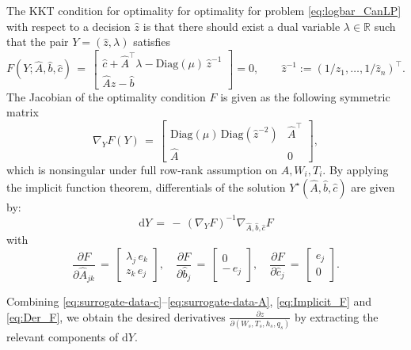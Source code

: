 \documentclass{article}
\begin{document}
The KKT condition for optimality for optimality for problem \ref{eq:logbar_CanLP} with respect to a decision $\hat z$ is that there should exist a dual variable $\lambda \in \mathbb{R}$ such that the pair $Y =  (\hat z,\lambda)$ satisfies
\begin{equation}
F(Y;\hat A,\hat b,\hat c) \,=\, \begin{bmatrix} \hat c + \hat A^\top \lambda - \mathrm{Diag}(\mu)\,\hat z^{-1} \\ \hat A \hat z - \hat b \end{bmatrix} = 0,\qquad \hat z^{-1} := (1/\hat z_1,\dots,1/\hat z_n)^\top.
\end{equation}
The Jacobian of the optimality condition $F$ is given as the following symmetric matrix
\begin{equation}
\nabla_Y F(Y) \,=\, \begin{bmatrix} \mathrm{Diag}(\mu)\,\mathrm{Diag}(\hat z^{-2}) & \hat A^\top \\ \hat A & 0 \end{bmatrix},
\end{equation}
which is nonsingular under full row-rank assumption on $A, W_i, T_i$. By applying the implicit function theorem, differentials of the solution $Y^\star(\hat A,\hat b,\hat c)$ are given by:
\begin{equation}\label{eq:Implicit_F}
\mathrm{d}Y \,=\, -\,(\nabla_Y F)^{-1}\nabla_{\hat A,\hat b,\hat c}F
\end{equation}
with
\begin{equation}\label{eq:Der_F}
\frac{\partial F}{\partial \hat A_{jk}} \,=\, \begin{bmatrix} \lambda_j \, e_k \\ z_k \, e_j \end{bmatrix},\quad
\frac{\partial F}{\partial \hat b_j} \,=\, \begin{bmatrix} 0 \\ -\,e_j \end{bmatrix},\quad
\frac{\partial F}{\partial \hat c_j} \,=\, \begin{bmatrix} e_j \\ 0 \end{bmatrix}.
\end{equation}

Combining \eqref{eq:surrogate-data-c}--\eqref{eq:surrogate-data-A}, \eqref{eq:Implicit_F} and \eqref{eq:Der_F}, we obtain the desired derivatives $\tfrac{\partial z}{\partial (W_s,T_s,h_s,q_s)}$ by extracting the relevant components of $\mathrm{d}Y$.
\end{document}
